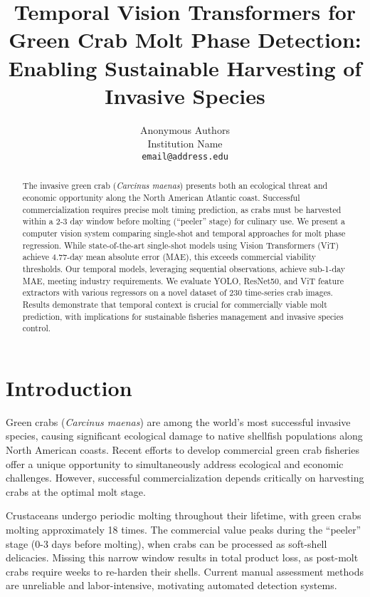 \documentclass[10pt,twocolumn,letterpaper]{article}
\title{Temporal Vision Transformers for Green Crab Molt Phase Detection:\\
Enabling Sustainable Harvesting of Invasive Species}
\author{Anonymous Authors\\
Institution Name\\
{\tt\small email@address.edu}
}
\begin{document}
\maketitle

\begin{abstract}
The invasive green crab (\textit{Carcinus maenas}) presents both an ecological threat and economic opportunity along the North American Atlantic coast. Successful commercialization requires precise molt timing prediction, as crabs must be harvested within a 2-3 day window before molting (``peeler'' stage) for culinary use. We present a computer vision system comparing single-shot and temporal approaches for molt phase regression. While state-of-the-art single-shot models using Vision Transformers (ViT) achieve 4.77-day mean absolute error (MAE), this exceeds commercial viability thresholds. Our temporal models, leveraging sequential observations, achieve sub-1-day MAE, meeting industry requirements. We evaluate YOLO, ResNet50, and ViT feature extractors with various regressors on a novel dataset of 230 time-series crab images. Results demonstrate that temporal context is crucial for commercially viable molt prediction, with implications for sustainable fisheries management and invasive species control.
\end{abstract}

\section{Introduction}

Green crabs (\textit{Carcinus maenas}) are among the world's most successful invasive species, causing significant ecological damage to native shellfish populations along North American coasts. Recent efforts to develop commercial green crab fisheries offer a unique opportunity to simultaneously address ecological and economic challenges. However, successful commercialization depends critically on harvesting crabs at the optimal molt stage.

Crustaceans undergo periodic molting throughout their lifetime, with green crabs molting approximately 18 times. The commercial value peaks during the ``peeler'' stage (0-3 days before molting), when crabs can be processed as soft-shell delicacies. Missing this narrow window results in total product loss, as post-molt crabs require weeks to re-harden their shells. Current manual assessment methods are unreliable and labor-intensive, motivating automated detection systems.
\end{document}
